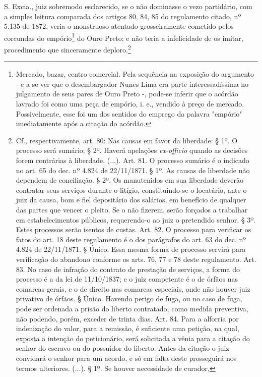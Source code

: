 S. Excia., juiz sobremodo esclarecido, se o não dominasse o vezo
partidário, com a simples leitura comparada dos artigos 80, 84, 85 do
regulamento citado, nº 5.135 de 1872, veria o monstruoso atentado
grosseiramente cometido pelos corcundas do empório\footnote{Mercado,
  bazar, centro comercial. Pela sequência na exposição do argumento - e
  a se ver que o desembargador Nunes Lima era parte interessadíssima no
  julgamento de seus pares de Ouro Preto -, pode-se inferir que o
  acórdão lavrado foi como uma peça de empório, i. e., vendido à preço
  de mercado. Possivelmente, esse foi um dos sentidos do emprego da
  palavra "empório" imediatamente após a citação do acórdão.} do Ouro
Preto; e não teria a infelicidade de os imitar, procedimento que
sinceramente deploro.\footnote{Cf., respectivamente, art. 80: Nas
  causas em favor da liberdade: § 1º. O processo será sumário; § 2º.
  Haverá apelações \emph{ex-officio} quando as decisões forem contrárias
  à liberdade. (...). Art. 81. O processo sumário é o indicado no art.
  65 do dec. nº 4.824 de 22/11/1871. § 1º. As causas de liberdade não
  dependem de conciliação. § 2º. Os manutenidos em sua liberdade deverão
  contratar seus serviços durante o litígio, constituindo-se o
  locatário, ante o juiz da causa, bom e fiel depositário dos salários,
  em benefício de qualquer das partes que vencer o pleito. Se o não
  fizerem, serão forçados a trabalhar em estabelecimentos públicos,
  requerendo-o ao juiz o pretendido senhor. § 3º. Estes processos serão
  isentos de custas. Art. 82. O processo para verificar os fatos do art.
  18 deste regulamento é o dos parágrafos do art. 63 do dec. nº 4.824 de
  22/11/1871. § Único. Essa mesma forma de processo servirá para
  verificação do abandono conforme os arts. 76, 77 e 78 deste
  regulamento. Art. 83. No caso de infração do contrato de prestação de
  serviços, a forma do processo é a da lei de 11/10/1837; e o juiz
  competente é o de órfãos nas comarcas gerais, e o de direito nas
  comarcas especiais, onde não houver juiz privativo de órfãos. § Único.
  Havendo perigo de fuga, ou no caso de fuga, pode ser ordenada a prisão
  do liberto contratado, como medida preventiva, não podendo, porém,
  exceder de trinta dias. Art. 84. Para a alforria por indenização do
  valor, para a remissão, é suficiente uma petição, na qual, exposta a
  intenção do peticionário, será solicitada a vênia para a citação do
  senhor do escravo ou do possuidor do liberto. Antes da citação o juiz
  convidará o senhor para um acordo, e só em falta deste prosseguirá nos
  termos ulteriores. (...). § 1º. Se houver necessidade de curador,
}
